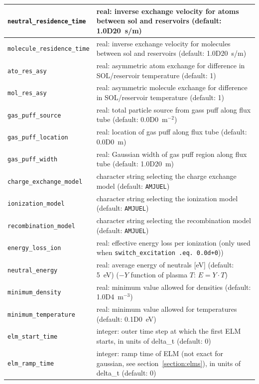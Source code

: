 \documentclass[amsmath,amssymb,a4]{revtex4-2}
\begin{document}
\begin{longtable}{| p{} | p{} |}
    {\tt neutral\_residence\_time}   & real: inverse exchange velocity for atoms between sol and reservoirs (default: 1.0D20~s/m) \\ \hline
    {\tt molecule\_residence\_time}  & real:  inverse exchange velocity for molecules between sol and reservoirs (default: 1.0D20~s/m) \\ \hline
    {\tt ato\_res\_asy}          & real: asymmetric atom exchange for difference in SOL/reservoir temperature (default: 1) \\ \hline
    {\tt mol\_res\_asy}          & real: asymmetric molecule exchange for difference in SOL/reservoir temperature (default: 1) \\ \hline 
    {\tt gas\_puff\_source}      & real: total particle source from gass puff along flux tube (default: 0.0D0~m$^{-2}$) \\ \hline
    {\tt gas\_puff\_location}    & real: location of gas puff along flux tube (default: 0.0D0~m) \\ \hline
    {\tt gas\_puff\_width}       & real: Gaussian width of gas puff region along flux tube (default: 1.0D20~m) \\ \hline
    {\tt charge\_exchange\_model}& character string selecting the charge exchange model (default: {\tt AMJUEL}) \\ \hline
    {\tt ionization\_model}      & character string selecting the ionization model (default: {\tt AMJUEL}) \\ \hline
    {\tt recombination\_model}   & character string selecting the recombination model (default: {\tt AMJUEL}) \\ \hline
    {\tt energy\_loss\_ion}      & real: effective energy loss per ionization (only used when {\tt switch\_excitation .eq. 0.0d+0})) \\ \hline
    {\tt neutral\_energy}        & real: average energy of neutrals [eV] (default: 5~eV) ($-Y$ function of plasma $T$: $E= Y\cdot T$)\\ \hline
    {\tt minimum\_density}       & real: minimum value allowed for densities (default: 1.0D4~m$^{-3}$) \\ \hline
    {\tt minimum\_temperature}   & real: minimum value allowed for temperatures (default: 0.1D0~eV) \\ \hline
    {\tt elm\_start\_time}   	 & integer: outer time step at which the first ELM starts, in units of delta\_t (default: 0) \\ \hline
    {\tt elm\_ramp\_time}   	 & integer: ramp time of ELM (not exact for gaussian, see section~\ref{section:elms}), in units of delta\_t (default: 0) \\ \hline

\end{longtable}
\end{document}
